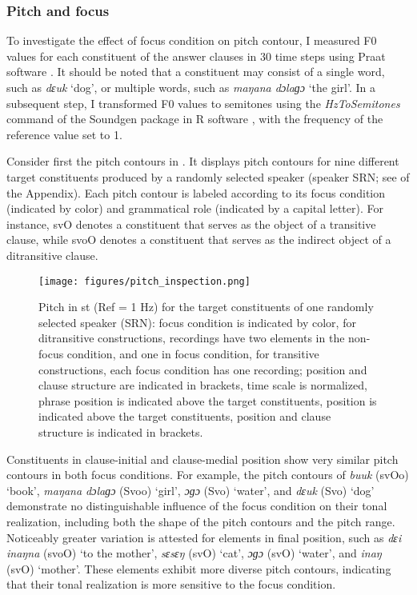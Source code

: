 \subsubsection{Pitch and focus}
\label{sec:pitch-and-focus}



To investigate the effect of focus condition on pitch contour, I measured F0 values   for each constituent of the answer clauses in 30 time steps using Praat software \citep{Praat}. It should be noted that a constituent may consist of a single word, such as \textit{dɛuk} `dog', or multiple words, such as \textit{maŋana dɔlaɡɔ} `the girl'. In a subsequent step, I transformed F0 values to semitones using the \textit{HzToSemitones} command of the Soundgen package \citep{soundgen_R}  in R software   \citep{R_manual}, with the frequency of the reference value set to 1.


Consider first the pitch contours in  . It displays pitch contours for nine different target constituents produced by a randomly selected speaker (speaker SRN; see  	  of the Appendix). Each pitch contour is labeled according to its focus condition (indicated by color) and grammatical role (indicated by a capital letter). For instance, svO denotes a constituent that serves as the object of a transitive clause, while svoO denotes a constituent that serves as the indirect object of a ditransitive clause.


\begin{figure}
	\texttt{[image: figures/pitch\_inspection.png]}
	\caption{Pitch  in st (Ref = 1 Hz) for the target constituents of one randomly selected speaker (SRN): focus condition is indicated by color, for ditransitive constructions, recordings have two elements in the non-focus condition, and one in focus condition, for transitive constructions, each focus condition has one recording; position and clause structure are indicated in brackets, time scale is normalized, phrase position is indicated above the target constituents, position is indicated above the target constituents, position and clause structure is indicated in brackets.}
	\label{pitch:pitch inspection}
\end{figure}



Constituents in clause-initial and clause-medial position show very similar pitch contours in both focus conditions.  For example, the pitch contours of \textit{buuk} (svOo)  `book', \textit{maŋana dɔlaɡɔ} (Svoo)  `girl', \textit{ɔɡɔ} (Svo)  `water', and \textit{dɛuk} (Svo)  `dog' demonstrate no distinguishable influence of the focus condition on their tonal realization, including both the shape of the pitch contours and the pitch range. Noticeably greater variation is attested for elements in final position, such as \textit{dɛi inaŋna} (svoO) `to the mother', \textit{sɛsɛŋ} (svO) `cat', \textit{ɔɡɔ} (svO) `water', and \textit{inaŋ} (svO) `mother'. These elements exhibit more diverse pitch contours, indicating that their tonal realization is more sensitive to the focus condition.



